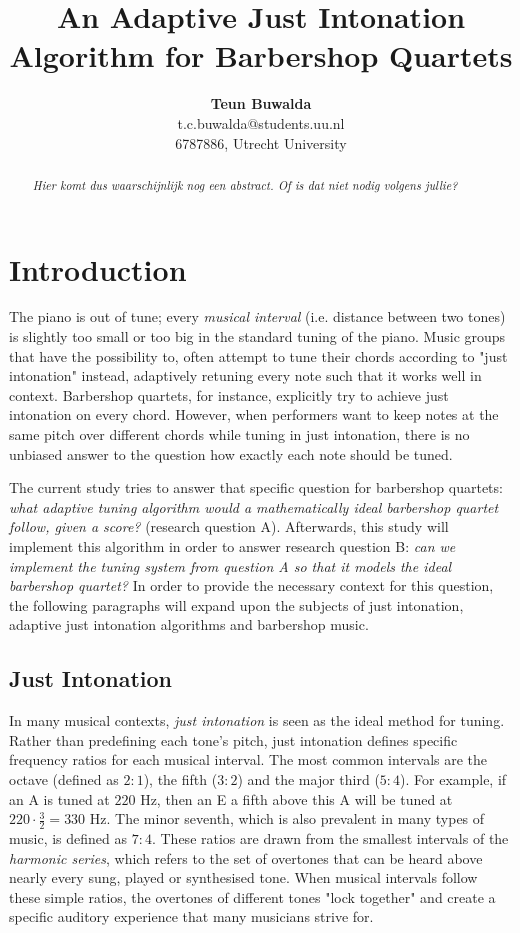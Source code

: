 \documentclass[a4paper]{article}
\title{An Adaptive Just Intonation Algorithm for Barbershop Quartets}
\author{{\bf Teun Buwalda}\\t.c.buwalda@students.uu.nl\\6787886, Utrecht University}
\begin{document}
\maketitle


\begin{abstract}
	\textit{\color{red}Hier komt dus waarschijnlijk nog een abstract. Of is dat niet nodig volgens jullie?}
\end{abstract}

\section{Introduction}
The piano is out of tune; every \textit{musical interval} (i.e. distance between two tones) is slightly too small or too big in the standard tuning of the piano.\cite{van_de_craats_fis_1989} Music groups that have the possibility to, often attempt to tune their chords according to "just intonation" instead, adaptively retuning every note such that it works well in context. Barbershop quartets, for instance, explicitly try to achieve just intonation on every chord. However, when performers want to keep notes at the same pitch over different chords while tuning in just intonation, there is no unbiased answer to the question how exactly each note should be tuned.

The current study tries to answer that specific question for barbershop quartets: {\it what adaptive tuning algorithm would a mathematically ideal barbershop quartet follow, given a score?} (research question A). Afterwards, this study will implement this algorithm in order to answer research question B: {\it can we implement the tuning system from question A so that it models the ideal barbershop quartet?} In order to provide the necessary context for this question, the following paragraphs will expand upon the subjects of just intonation, adaptive just intonation algorithms and barbershop music.

\subsection{Just Intonation}
\label{intro_ji}

In many musical contexts, {\it just intonation} is seen as the ideal method for tuning. Rather than predefining each tone's pitch, just intonation defines specific frequency ratios for each musical interval. The most common intervals are the octave (defined as $2:1$), the fifth ($3:2$) and the major third ($5:4$). For example, if an A is tuned at $220$ Hz, then an E a fifth above this A will be tuned at $220 \cdot \frac32 = 330$ Hz. The minor seventh, which is also prevalent in many types of music, is defined as $7:4$. These ratios are drawn from the smallest intervals of the \textit{harmonic series}, which refers to the set of overtones that can be heard above nearly every sung, played or synthesised tone. When musical intervals follow these simple ratios, the overtones of different tones "lock together" and create a specific auditory experience that many musicians strive for.
\end{document}
